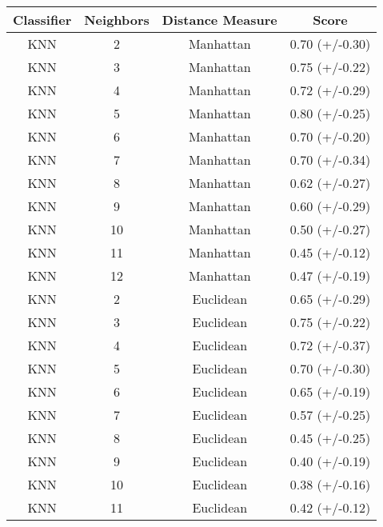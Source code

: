 \documentclass{article}
\begin{document}
            \begin{tabular}{cccc}
              \toprule
              Classifier &  Neighbors &       Distance Measure &           Score \\
              \midrule
              KNN &          2 &              Manhattan &  0.70 (+/-0.30) \\
              KNN &          3 &              Manhattan &  0.75 (+/-0.22) \\
              KNN &          4 &              Manhattan &  0.72 (+/-0.29) \\
              KNN &          5 &              Manhattan &  0.80 (+/-0.25) \\
              KNN &          6 &              Manhattan &  0.70 (+/-0.20) \\
              KNN &          7 &              Manhattan &  0.70 (+/-0.34) \\
              KNN &          8 &              Manhattan &  0.62 (+/-0.27) \\
              KNN &          9 &              Manhattan &  0.60 (+/-0.29) \\
              KNN &         10 &              Manhattan &  0.50 (+/-0.27) \\
              KNN &         11 &              Manhattan &  0.45 (+/-0.12) \\
              KNN &         12 &              Manhattan &  0.47 (+/-0.19) \\
              KNN &          2 &              Euclidean &  0.65 (+/-0.29) \\
              KNN &          3 &              Euclidean &  0.75 (+/-0.22) \\
              KNN &          4 &              Euclidean &  0.72 (+/-0.37) \\
              KNN &          5 &              Euclidean &  0.70 (+/-0.30) \\
              KNN &          6 &              Euclidean &  0.65 (+/-0.19) \\
              KNN &          7 &              Euclidean &  0.57 (+/-0.25) \\
              KNN &          8 &              Euclidean &  0.45 (+/-0.25) \\
              KNN &          9 &              Euclidean &  0.40 (+/-0.19) \\
              KNN &         10 &              Euclidean &  0.38 (+/-0.16) \\
              KNN &         11 &              Euclidean &  0.42 (+/-0.12) \\

\end{tabular}
\end{document}
